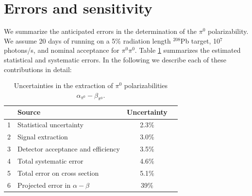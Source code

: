 \section{Errors and sensitivity}
We summarize the anticipated errors in the determination of the $\pi^0$ polarizability. We assume 
20 days of running on a 5\% radiation length $^{208}$Pb target, 10$^7$ photons/s, and nominal acceptance for $\pi^0 \pi^0$.
Table \ref{errors} summarizes the estimated statistical and systematic errors. In the following we describe each of
these contributions in detail: 

\begin{table}[bt]
\caption{Uncertainties in the extraction of $\pi^0$ polarizabilities $\alpha_{\pi^0}-\beta_{\pi^0}$.
\label{errors}
}
\begin{center}
\begin{tabular}{|l|l|c|c|}
\hline
\hline
  &  {\bf Source}  & {\bf Uncertainty}   \\  \hline \hline
  1 & Statistical uncertainty  &  2.3\%    \\ \hline
  2 & Signal extraction  & 3.0\%  \\ \hline
  3 & Detector acceptance and efficiency &  3.5\%   \\ \hline
  4 & Total systematic error  &  4.6\% \\ \hline
  5 & Total error on cross section  &  5.1\% \\ \hline
  6 & Projected error in $\alpha - \beta$ &  39\%  \\ 
 \hline
 \hline
\end{tabular}
\end{center}
\end{table}

